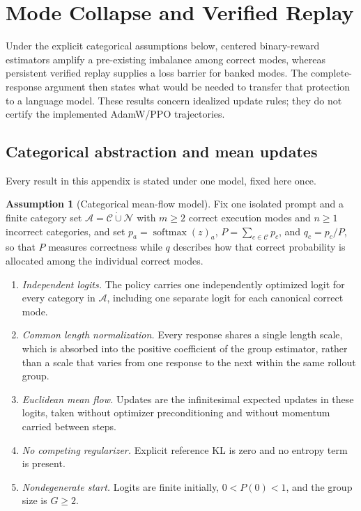 \documentclass{article}
\newcommand{\1}{\mathbf 1}
\theoremstyle{remark}
\theoremstyle{definition}
\newtheorem{assumption}[lemma]{Assumption}
\theoremstyle{plain}
\begin{document}
\section{Mode Collapse and Verified Replay}
\label{app:theory}

Under the explicit categorical assumptions below, centered binary-reward
estimators amplify a pre-existing imbalance among correct modes,
whereas persistent verified replay supplies a loss barrier for banked modes.
The complete-response argument then states what would be needed to transfer
that protection to a language model. These results concern idealized update
rules; they do not certify the implemented AdamW/PPO trajectories.

\subsection{Categorical abstraction and mean updates}
\label{app:theory-grpo-mean}

Every result in this appendix is stated under one model, fixed here once.

\begin{assumption}[Categorical mean-flow model]
\label{ass:categorical-mean-flow}
Fix one isolated prompt and a finite category set
$\mathcal A=\mathcal C\mathbin{\dot\cup}\mathcal N$ with $m\ge2$ correct
execution modes and $n\ge1$ incorrect categories, and set
$p_a=\operatorname{softmax}(z)_a$, $P=\sum_{c\in\mathcal C}p_c$, and
$q_c=p_c/P$, so that $P$ measures correctness while $q$ describes how that
correct probability is allocated among the individual correct modes.
\begin{enumerate}
\item[(A1)] \emph{Independent logits.} The policy carries one independently
  optimized logit for every category in $\mathcal A$, including one separate
  logit for each canonical correct mode.
\item[(A2)] \emph{Common length normalization.} Every response shares a single
  length scale, which is absorbed into the positive coefficient of the group
  estimator, rather than a scale that varies from one response to the next
  within the same rollout group.
\item[(A3)] \emph{Euclidean mean flow.} Updates are the infinitesimal expected
  updates in these logits, taken without optimizer preconditioning and without
  momentum carried between steps.
\item[(A4)] \emph{No competing regularizer.} Explicit reference KL is zero and
  no entropy term is present.
\item[(A5)] \emph{Nondegenerate start.} Logits are finite initially,
  $0<P(0)<1$, and the group size is $G\ge2$.
\end{enumerate}
\end{assumption}
\end{document}
